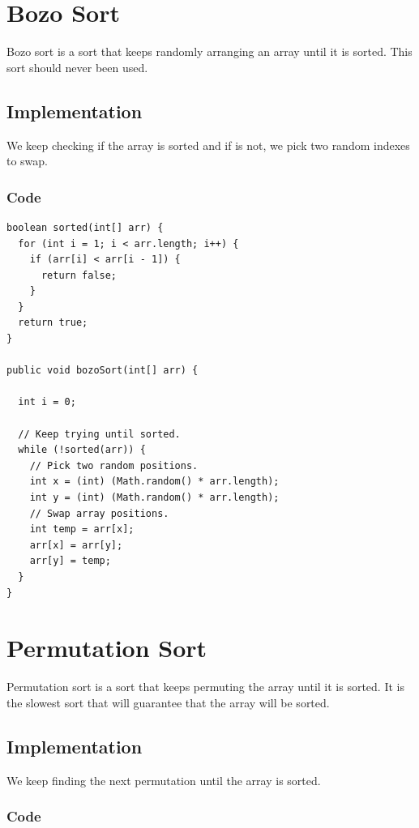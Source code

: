 \documentclass[11pt,oneside]{book}
\begin{document}
        \section{ Bozo Sort }
        

Bozo sort is a sort that keeps randomly arranging an array until it is sorted. This sort should never been used.

\subsection{Implementation}

We keep checking if the array is sorted and if is not, we pick two random indexes to swap.

\subsubsection{Code}

\begin{lstlisting}
boolean sorted(int[] arr) {
  for (int i = 1; i < arr.length; i++) {
    if (arr[i] < arr[i - 1]) {
      return false;
    }
  }
  return true;
}

public void bozoSort(int[] arr) {

  int i = 0;

  // Keep trying until sorted.
  while (!sorted(arr)) {
    // Pick two random positions.
    int x = (int) (Math.random() * arr.length);
    int y = (int) (Math.random() * arr.length);
    // Swap array positions.
    int temp = arr[x];
    arr[x] = arr[y];
    arr[y] = temp;
  }
}
\end{lstlisting}

        \section{ Permutation Sort }
        

Permutation sort is a sort that keeps permuting the array until it is sorted. It is the slowest sort that will guarantee that the array will be sorted.

\subsection{Implementation}

We keep finding the next permutation until the array is sorted.

\subsubsection{Code}
\end{document}
